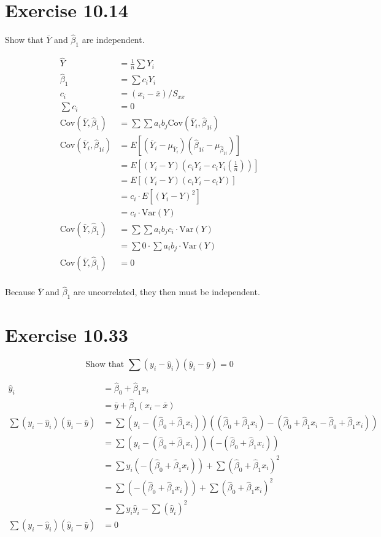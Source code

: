 \documentclass{article}
\newcommand{\var}{\text{Var}}
\newcommand{\cov}{\text{Cov}}
\begin{document}
\section*{Exercise 10.14}

Show that $\bar{Y}$ and $\hat{\beta}_1$ are independent.

\begin{align*}
	\hat{Y} &= \tfrac{1}{n} \sum Y_i\\
	\hat{\beta}_1 &= \sum c_i Y_i \\
	c_i &= (x_i - \bar{x}) / S_{xx} \\
	\sum c_i &= 0 \\
	\cov(\bar{Y},\hat{\beta}_1) &= \sum \sum a_i b_j \cov (\bar{Y}_i,\hat{\beta}_{1i}) \\
	\cov (\bar{Y}_i,\hat{\beta}_{1i}) &= E[(\bar{Y}_i - \mu_{\bar{Y}_i})(\hat{\beta}_{1i} - \mu_{\hat{\beta}_{1i}})] \\
	&= E[(Y_i - Y)(c_iY_i - c_iY_i (\tfrac{1}{n}))] \\
	&= E[(Y_i - Y)(c_iY_i - c_iY)] \\
	&= c_i\cdot E[(Y_i - Y)^2] \\
	&= c_i\cdot \var(Y) \\
	\cov(\bar{Y},\hat{\beta}_1) &= \sum \sum a_i b_j c_i \cdot \var(Y) \\
	&= \sum 0 \cdot \sum a_i b_j \cdot \var(Y) \\
	\cov(\bar{Y},\hat{\beta}_1) &= 0 \\
\end{align*}

Because $\bar{Y}$ and $\hat{\beta}_1$ are uncorrelated, they then must be independent.


\section*{Exercise 10.33}

\[ \text{Show that   } \sum (y_i - \hat{y}_i)(\hat{y}_i - \bar{y}) = 0 \]

\begin{align*}
	\hat{y}_i &= \hat{\beta}_0 + \hat{\beta}_1x_i\\
	&= \bar{y} + \hat{\beta}_1(x_i - \bar{x})\\
	\sum (y_i - \hat{y}_i)(\hat{y}_i - \bar{y}) &= \sum (y_i - (\hat{\beta}_0 + \hat{\beta}_1x_i))((\hat{\beta}_0 + \hat{\beta}_1x_i) - (\hat{\beta}_0 + \hat{\beta}_1x_i - \hat{\beta}_0 + \hat{\beta}_1x_i)) \\
	&= \sum (y_i - (\hat{\beta}_0 + \hat{\beta}_1x_i))(- (\hat{\beta}_0 + \hat{\beta}_1x_i)) \\
	&= \sum y_i(- (\hat{\beta}_0 + \hat{\beta}_1x_i)) + \sum (\hat{\beta}_0 + \hat{\beta}_1x_i)^2 \\
	&=  \sum(- (\hat{\beta}_0 + \hat{\beta}_1x_i)) + \sum (\hat{\beta}_0 + \hat{\beta}_1x_i)^2 \\
	&= \sum y_i \hat{y}_i - \sum (\hat{y}_i)^2 \\
	\sum (y_i - \hat{y}_i)(\hat{y}_i - \bar{y}) &= 0
\end{align*}
\end{document}
